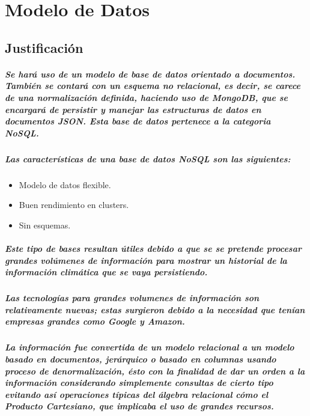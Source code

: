 \clearpage
\chapter{Modelo de Datos}

\section{Justificación}
\paragraph{Se hará uso de un modelo de base de datos orientado a documentos. También se contará con un esquema no relacional, es decir, se carece de una normalización definida, haciendo uso de  MongoDB, que se encargará de persistir y manejar las estructuras de datos en documentos JSON. Esta base de datos pertenece a la categoria NoSQL.}
\paragraph{ Las características de una base de datos NoSQL son las siguientes: }

\begin{itemize}
  \item Modelo de datos flexible.
  \item Buen rendimiento en clusters. 
  \item Sin esquemas.
\end{itemize}

\paragraph{Este tipo de bases resultan útiles debido a que se se pretende procesar grandes volúmenes de información para mostrar un historial de la información climática que se vaya persistiendo.}

\paragraph{Las tecnologías para grandes volumenes de información son relativamente nuevas; estas surgieron debido a la necesidad que tenían empresas grandes como Google y Amazon.} 

\paragraph{La información fue convertida de un modelo relacional a un modelo basado en documentos, jerárquico o basado en columnas usando proceso de denormalización, ésto con la finalidad de dar un orden a la información considerando simplemente consultas de cierto tipo evitando así operaciones típicas del álgebra relacional cómo el Producto Cartesiano, que implicaba el uso de grandes recursos.}

